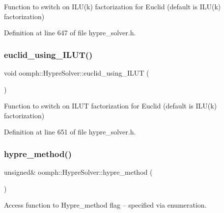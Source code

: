 Function to switch on I\+L\+U(k) factorization for Euclid (default is I\+L\+U(k) factorization) 



Definition at line 647 of file hypre\+\_\+solver.\+h.

\mbox{\label{classoomph_1_1HypreSolver_a831cd8c7324a117e2949ee734adf95cd}} 
\subsubsection{\texorpdfstring{euclid\+\_\+using\+\_\+\+I\+L\+U\+T()}{euclid\_using\_ILUT()}}
{\footnotesize\ttfamily void oomph\+::\+Hypre\+Solver\+::euclid\+\_\+using\+\_\+\+I\+L\+UT (\begin{DoxyParamCaption}{ }\end{DoxyParamCaption})\hspace{0.3cm}{\ttfamily [inline]}}



Function to switch on I\+L\+UT factorization for Euclid (default is I\+L\+U(k) factorization) 



Definition at line 651 of file hypre\+\_\+solver.\+h.

\mbox{\label{classoomph_1_1HypreSolver_a2e6f6cbb98d3bdf91ae657eb2a0a87d9}} 
\subsubsection{\texorpdfstring{hypre\+\_\+method()}{hypre\_method()}}
{\footnotesize\ttfamily unsigned\& oomph\+::\+Hypre\+Solver\+::hypre\+\_\+method (\begin{DoxyParamCaption}{ }\end{DoxyParamCaption})\hspace{0.3cm}{\ttfamily [inline]}}



Access function to Hypre\+\_\+method flag -- specified via enumeration. 



